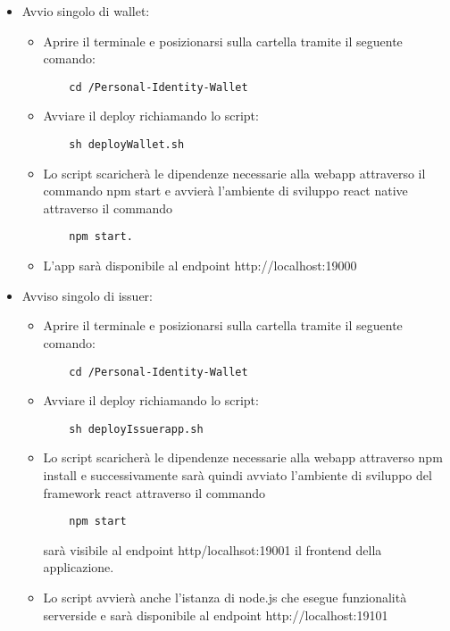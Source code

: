 \begin{itemize}
\item Avvio singolo di wallet:
\begin{itemize}
\item Aprire il terminale e posizionarsi sulla cartella tramite il seguente comando: 
\begin{verbatim}
    cd /Personal-Identity-Wallet
\end{verbatim}
\item Avviare il deploy richiamando lo script:
\begin{verbatim}
    sh deployWallet.sh
\end{verbatim} 
\item Lo script scaricherà le dipendenze necessarie alla webapp attraverso il commando npm start e avvierà l’ambiente di sviluppo react native attraverso il commando 
\begin{verbatim}
    npm start.
\end{verbatim}
\item L’app sarà disponibile al endpoint http://localhost:19000
\end{itemize}

\item Avviso singolo di issuer:
\begin{itemize}
\item Aprire il terminale e posizionarsi sulla cartella tramite il seguente comando: 
\begin{verbatim}
    cd /Personal-Identity-Wallet
\end{verbatim}
\item Avviare il deploy richiamando lo script:
\begin{verbatim}
    sh deployIssuerapp.sh
\end{verbatim}
\item Lo script scaricherà le dipendenze necessarie alla webapp attraverso npm install e successivamente sarà quindi avviato l’ambiente di sviluppo del framework react attraverso il commando 
\begin{verbatim}
    npm start 
\end{verbatim} 
sarà visibile al endpoint http/localhsot:19001 il frontend della applicazione.
\item Lo script avvierà anche l’istanza di node.js che esegue funzionalità serverside e sarà disponibile al endpoint http://localhost:19101
\end{itemize}


\end{itemize}
